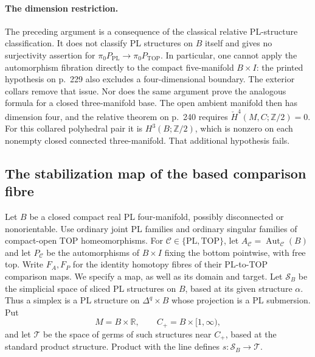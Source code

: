 \paragraph{The dimension restriction.}
The preceding argument is a consequence of the classical relative
PL-structure classification.  It does not classify PL structures on
$B$ itself and gives no surjectivity assertion for
$\pi_0P_{\mathrm{PL}}\to\pi_0P_{\mathrm{TOP}}$.  In particular,
one cannot apply the automorphism fibration directly to the compact
five-manifold $B\times I$: the printed hypothesis on p.~229 also
excludes a four-dimensional boundary.  The exterior collars remove
that issue.  Nor does the same argument prove the analogous formula
for a closed three-manifold base.  The open ambient manifold then
has dimension four, and the relative theorem on p.~240 requires
$\check H^4(M,C;\mathbb Z/2)=0$.  For this collared polyhedral pair
it is $H^3(B;\mathbb Z/2)$, which is nonzero on each nonempty closed
connected three-manifold.  That additional hypothesis fails.


\subsection{The stabilization map of the based comparison fibre}

Let $B$ be a closed compact real PL four-manifold, possibly
disconnected or nonorientable.  Use ordinary joint PL families and
ordinary singular families of compact-open TOP homeomorphisms.
For $\mathcal C\in\{\mathrm{PL},\mathrm{TOP}\}$, let
$A_{\mathcal C}=\operatorname{Aut}_{\mathcal C}(B)$ and let
$P_{\mathcal C}$ be the automorphisms of $B\times I$ fixing the
bottom pointwise, with free top.  Write $F_A,F_P$ for the identity
homotopy fibres of their PL-to-TOP comparison maps.  We specify a
map, as well as its domain and target.  Let $\mathcal S_B$ be the
simplicial space of sliced PL
structures on $B$, based at its given structure $\alpha$.  Thus a
simplex is a PL structure on $\Delta^q\times B$ whose projection is
a PL submersion.  Put
\[
 M=B\times\mathbb R,\qquad C_+=B\times[1,\infty),
\]
and let $\mathcal T$ be the space of germs of such structures near
$C_+$, based at the standard product structure.  Product with the
line defines $s:\mathcal S_B\to\mathcal T$.

